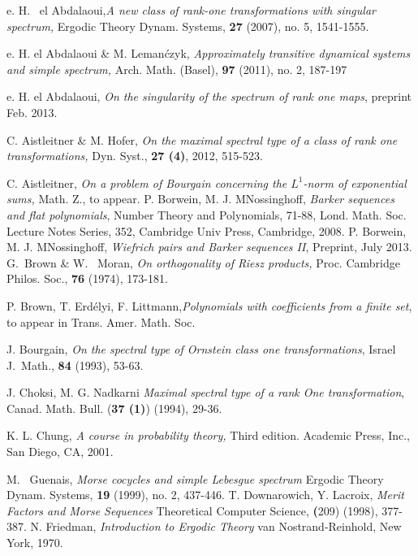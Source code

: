 \documentclass{amsart}
\theoremstyle{definition}
\theoremstyle{remark}
\numberwithin{equation}{section}
\newcommand{\1}{\mathbb{1}}
\begin{document}
\begin{thebibliography}{99-}

 e. H. ~el Abdalaoui,{\em A new class of rank-one transformations with singular spectrum,} Ergodic Theory Dynam. Systems,
 \textbf{27} (2007), no. 5, 1541-1555.

e. H. el Abdalaoui \& M. Leman\'czyk, {\em Approximately transitive dynamical systems and simple spectrum,} Arch. Math. (Basel),
 {\textbf{97}} (2011), no. 2, 187-197

e. H. el Abdalaoui, {\em On the singularity of the spectrum of rank one maps}, {preprint Feb. 2013.}

C. Aistleitner \& M. Hofer, {\em On the maximal spectral type of a class of rank one
transformations,} Dyn. Syst., {\textbf{27 (4)}}, 2012, 515-523.

C. Aistleitner, {\em On a problem of Bourgain concerning the $L^1$-norm of exponential sums,}
Math. Z., to appear.
 P. Borwein, M. J. MNossinghoff, {\em Barker sequences and flat polynomials}, Number Theory and Polynomials, 71-88, Lond. Math. Soc. Lecture Notes Series, 352, Cambridge Univ Press, Cambridge, 2008.
 P. Borwein, M. J. MNossinghoff, {\em Wiefrich pairs and Barker sequences II}, Preprint, July 2013.
G.~Brown \& W.~ Moran, {\em On orthogonality of Riesz products,} Proc. Cambridge Philos. Soc., \textbf{76} (1974), 173-181.

P. Brown, T. Erd\'elyi, F. Littmann,{\em Polynomials with coefficients from a finite
set}, to appear in Trans. Amer. Math. Soc.

J. Bourgain,\emph{ On the spectral type of Ornstein class one transformations}, Israel J.\ Math., {\textbf{ 84}} (1993), 53-63.

J. Choksi, M. G. Nadkarni {\em Maximal spectral type of a rank One transformation}, Canad. Math. Bull. ({\textbf{37 (1)}}) (1994), 29-36.

K. L. Chung, {\em A course in probability theory,} Third edition. Academic Press, Inc., San Diego, CA, 2001.

M. ~Guenais, {\em Morse cocycles and simple Lebesgue spectrum } Ergodic Theory Dynam. Systems,
 \textbf{19} (1999), no. 2, 437-446.
T. Downarowich, Y. Lacroix, {\em Merit Factors and Morse Sequences} Theoretical Computer Science, \textbf(209) (1998), 377-387.
N. Friedman, {\em Introduction to Ergodic Theory} van Nostrand-Reinhold, New York, 1970.


\end{thebibliography}
\end{document}
